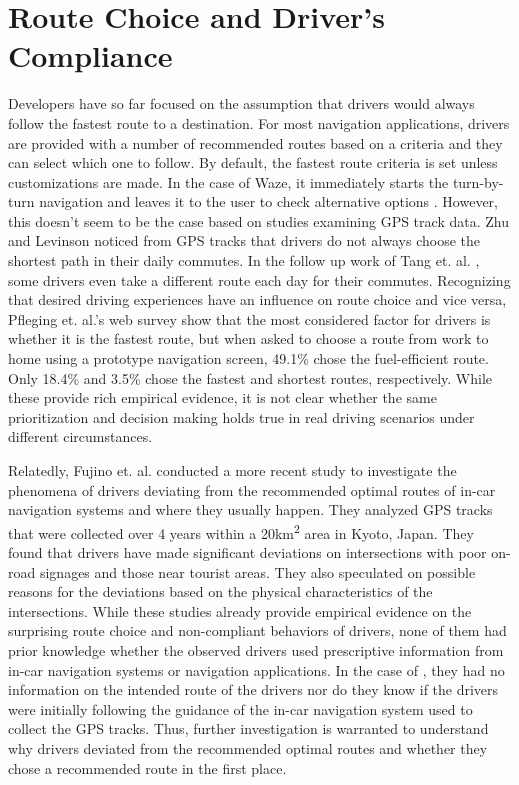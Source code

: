 \section{Route Choice and Driver's Compliance}
Developers have so far focused on the assumption that drivers would always follow the fastest route to a destination. For most navigation applications, drivers are provided with a number of recommended routes based on a criteria and they can select which one to follow. By default, the fastest route criteria is set unless customizations are made. In the case of Waze, it immediately starts the turn-by-turn navigation and leaves it to the user to check alternative options \cite{Levine2014SystemExchange}. However, this doesn't seem to be the case based on studies examining GPS track data. Zhu and Levinson \cite{Zhu2015DoPrinciple} noticed from GPS tracks that drivers do not always choose the shortest path in their daily commutes. In the follow up work of Tang et. al. \cite{Tang2016AnalyzingData}, some drivers even take a different route each day for their commutes. Recognizing that desired driving experiences have an influence on route choice and vice versa, Pfleging et. al.'s \cite{Pfleging2014ExperienceNavigation} web survey show that the most considered factor for drivers is whether it is the fastest route, but when asked to choose a route from work to home using a prototype navigation screen, 49.1\% chose the fuel-efficient route. Only 18.4\% and 3.5\% chose the fastest and shortest routes, respectively. While these provide rich empirical evidence, it is not clear whether the same prioritization and decision making holds true in real driving scenarios under different circumstances.

Relatedly, Fujino et. al. \cite{Fujino2018DetectingTracks} conducted a more recent study to investigate the phenomena of drivers deviating from the recommended optimal routes of in-car navigation systems and where they usually happen. They analyzed GPS tracks that were collected over 4 years within a 20km\textsuperscript{2} area in Kyoto, Japan. They found that drivers have made significant deviations on intersections with poor on-road signages and those near tourist areas. They also speculated on possible reasons for the deviations based on the physical characteristics of the intersections. While these studies already provide empirical evidence on the surprising route choice and non-compliant behaviors of drivers, none of them had prior knowledge whether the observed drivers used prescriptive information from in-car navigation systems or navigation applications. In the case of \cite{Zhu2015DoPrinciple, Tang2016AnalyzingData, Fujino2018DetectingTracks}, they had no information on the intended route of the drivers nor do they know if the drivers were initially following the guidance of the in-car navigation system used to collect the GPS tracks. Thus, further investigation is warranted to understand why drivers deviated from the recommended optimal routes and whether they chose a recommended route in the first place.

